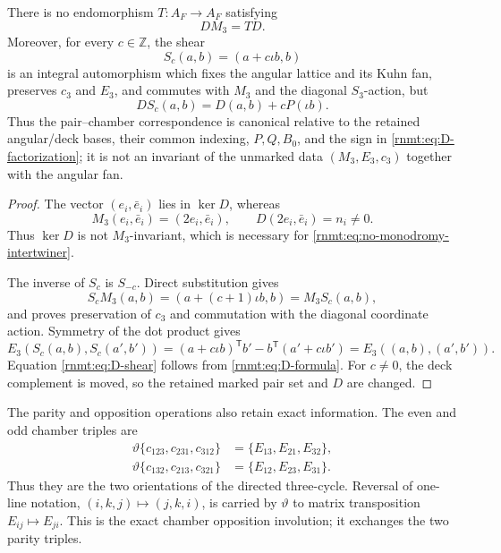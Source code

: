 \begin{proposition}
\label{rnmt:prop:marking-boundary}
There is no endomorphism \(T:A_F\to A_F\) satisfying
\begin{equation}
 DM_3=TD.
 \label{rnmt:eq:no-monodromy-intertwiner}
\end{equation}
Moreover, for every \(c\in\mathbb Z\), the shear
\begin{equation}
 S_c(a,b)=(a+c\iota b,b)
 \label{rnmt:eq:marking-shear}
\end{equation}
is an integral automorphism which fixes the angular lattice and its Kuhn
fan, preserves \(c_3\) and \(E_3\), and commutes with \(M_3\) and the
diagonal \(S_3\)-action, but
\begin{equation}
 DS_c(a,b)=D(a,b)+cP(\iota b).
 \label{rnmt:eq:D-shear}
\end{equation}
Thus the pair--chamber correspondence is canonical relative to the retained
angular/deck bases, their common indexing, \(P,Q,B_0\), and the sign in
\eqref{rnmt:eq:D-factorization}; it is not an invariant of the unmarked data
\((M_3,E_3,c_3)\) together with the angular fan.
\end{proposition}

\begin{proof}
The vector \((e_i,\bar e_i)\) lies in \(\ker D\), whereas
\[
 M_3(e_i,\bar e_i)=(2e_i,\bar e_i),\qquad
 D(2e_i,\bar e_i)=n_i\ne0.
\]
Thus \(\ker D\) is not \(M_3\)-invariant, which is necessary for
\eqref{rnmt:eq:no-monodromy-intertwiner}.

The inverse of \(S_c\) is \(S_{-c}\).  Direct substitution gives
\[
 S_cM_3(a,b)=(a+(c+1)\iota b,b)=M_3S_c(a,b),
\]
and proves preservation of \(c_3\) and commutation with the diagonal
coordinate action.  Symmetry of the dot product gives
\[
 E_3(S_c(a,b),S_c(a',b'))
 =(a+c\iota b)^{\mathsf T}b'
   -b^{\mathsf T}(a'+c\iota b')
 =E_3((a,b),(a',b')).
\]
Equation \eqref{rnmt:eq:D-shear} follows from
\eqref{rnmt:eq:D-formula}.  For \(c\ne0\), the deck complement is moved, so
the retained marked pair set and \(D\) are changed.
\end{proof}

The parity and opposition operations also retain exact information.  The
even and odd chamber triples are
\begin{align}
 \vartheta\{c_{123},c_{231},c_{312}\}
   &=\{E_{13},E_{21},E_{32}\},
 \label{rnmt:eq:even-cycle}\\
 \vartheta\{c_{132},c_{213},c_{321}\}
   &=\{E_{12},E_{23},E_{31}\}.
 \label{rnmt:eq:odd-cycle}
\end{align}
Thus they are the two orientations of the directed three-cycle.  Reversal of
one-line notation, \((i,k,j)\mapsto(j,k,i)\), is carried by \(\vartheta\) to
matrix transposition \(E_{ij}\mapsto E_{ji}\).  This is the exact chamber
opposition involution; it exchanges the two parity triples.


